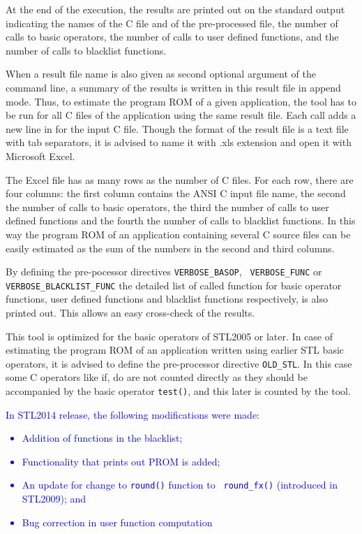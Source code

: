 At the end of the execution, the results are printed out on the
standard output indicating the names of the C file and of the
pre-processed file, the number of calls to basic operators, the number
of calls to user defined functions, and the number of calls to
blacklist functions.

When a result file name is also given as second optional argument of
the command line, a summary of the results is written in this result
file in append mode. Thus, to estimate the program ROM of a given
application, the tool has to be run for all C files of the application
using the same result file. Each call adds a new line in for the input
C file. Though the format of the result file is a text file with tab
separators, it is advised to name it with .xls extension and open it
with Microsoft Excel.

The Excel file has as many rows as the number of C files. For each
row, there are four columns: the first column contains the ANSI C
input file name, the second the number of calls to basic operators,
the third the number of calls to user defined functions and the fourth
the number of calls to blacklist functions. In this way the program
ROM of an application containing several C source files can be easily
estimated as the sum of the numbers in the second and third columns.

By defining the pre-pocessor directives {\tt VERBOSE\_BASOP}, {\tt
VERBOSE\_FUNC} or\\ {\tt VERBOSE\_BLACKLIST\_FUNC} the detailed list
of called function for basic operator functions, user defined
functions and blacklist functions respectively, is also printed
out. This allows an easy cross-check of the results.

This tool is optimized for the basic operators of STL2005 or later. In
case of estimating the program ROM of an application written using
earlier STL basic operators, it is advised to define the pre-processor
directive {\tt OLD\_STL}. In this case some C operators like if, do
are not counted directly as they should be accompanied by the basic
operator {\tt test()}, and this later is counted by the tool.

\textcolor{blue}{
%
In STL2014 release, the following modifications were made:
\begin{itemize}
    \item Addition of functions in the blacklist;
    \item Functionality that prints out PROM is added;
    \item An update for change to {\tt round()} function to {\tt
    round\_fx()} (introduced in STL2009); and
    \item Bug correction in user function computation
\end{itemize}
%
}


